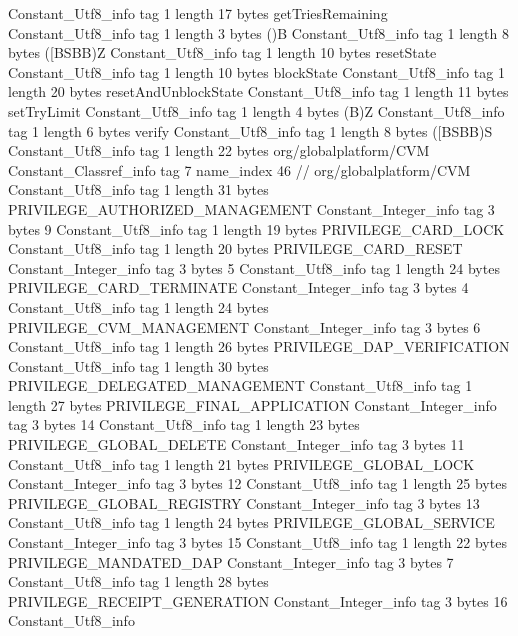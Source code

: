 {{{		}
		Constant_Utf8_info {
			tag	1
			length	17
			bytes	getTriesRemaining
		}
		Constant_Utf8_info {
			tag	1
			length	3
			bytes	()B
		}
		Constant_Utf8_info {
			tag	1
			length	8
			bytes	([BSBB)Z
		}
		Constant_Utf8_info {
			tag	1
			length	10
			bytes	resetState
		}
		Constant_Utf8_info {
			tag	1
			length	10
			bytes	blockState
		}
		Constant_Utf8_info {
			tag	1
			length	20
			bytes	resetAndUnblockState
		}
		Constant_Utf8_info {
			tag	1
			length	11
			bytes	setTryLimit
		}
		Constant_Utf8_info {
			tag	1
			length	4
			bytes	(B)Z
		}
		Constant_Utf8_info {
			tag	1
			length	6
			bytes	verify
		}
		Constant_Utf8_info {
			tag	1
			length	8
			bytes	([BSBB)S
		}
		Constant_Utf8_info {
			tag	1
			length	22
			bytes	org/globalplatform/CVM
		}
		Constant_Classref_info {
			tag	7
			name_index	46		// org/globalplatform/CVM
		}
		Constant_Utf8_info {
			tag	1
			length	31
			bytes	PRIVILEGE_AUTHORIZED_MANAGEMENT
		}
		Constant_Integer_info {
			tag	3
			bytes	9
		}
		Constant_Utf8_info {
			tag	1
			length	19
			bytes	PRIVILEGE_CARD_LOCK
		}
		Constant_Utf8_info {
			tag	1
			length	20
			bytes	PRIVILEGE_CARD_RESET
		}
		Constant_Integer_info {
			tag	3
			bytes	5
		}
		Constant_Utf8_info {
			tag	1
			length	24
			bytes	PRIVILEGE_CARD_TERMINATE
		}
		Constant_Integer_info {
			tag	3
			bytes	4
		}
		Constant_Utf8_info {
			tag	1
			length	24
			bytes	PRIVILEGE_CVM_MANAGEMENT
		}
		Constant_Integer_info {
			tag	3
			bytes	6
		}
		Constant_Utf8_info {
			tag	1
			length	26
			bytes	PRIVILEGE_DAP_VERIFICATION
		}
		Constant_Utf8_info {
			tag	1
			length	30
			bytes	PRIVILEGE_DELEGATED_MANAGEMENT
		}
		Constant_Utf8_info {
			tag	1
			length	27
			bytes	PRIVILEGE_FINAL_APPLICATION
		}
		Constant_Integer_info {
			tag	3
			bytes	14
		}
		Constant_Utf8_info {
			tag	1
			length	23
			bytes	PRIVILEGE_GLOBAL_DELETE
		}
		Constant_Integer_info {
			tag	3
			bytes	11
		}
		Constant_Utf8_info {
			tag	1
			length	21
			bytes	PRIVILEGE_GLOBAL_LOCK
		}
		Constant_Integer_info {
			tag	3
			bytes	12
		}
		Constant_Utf8_info {
			tag	1
			length	25
			bytes	PRIVILEGE_GLOBAL_REGISTRY
		}
		Constant_Integer_info {
			tag	3
			bytes	13
		}
		Constant_Utf8_info {
			tag	1
			length	24
			bytes	PRIVILEGE_GLOBAL_SERVICE
		}
		Constant_Integer_info {
			tag	3
			bytes	15
		}
		Constant_Utf8_info {
			tag	1
			length	22
			bytes	PRIVILEGE_MANDATED_DAP
		}
		Constant_Integer_info {
			tag	3
			bytes	7
		}
		Constant_Utf8_info {
			tag	1
			length	28
			bytes	PRIVILEGE_RECEIPT_GENERATION
		}
		Constant_Integer_info {
			tag	3
			bytes	16
		}
		Constant_Utf8_info {
}}}
